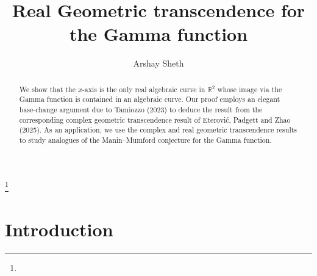 \documentclass[11pt,reqno]{amsart}
\theoremstyle{definition}
\numberwithin{equation}{section}
\begin{document}
\title{Real Geometric transcendence for the Gamma function}

\author{Arshay Sheth}
\address[Arshay Sheth]{School of Mathematics, Tata Institute of Fundamental Research, Homi Bhabha Road,
Mumbai - 400005, India.}
\urladdr{}

\thanks{}










\begin{abstract}
We show that the  $x$-axis is the only real algebraic curve in $\mathbb R^2$ whose image via the Gamma function is contained in an algebraic curve. Our proof employs an elegant base-change argument due to Tamiozzo (2023) to  deduce the result from the corresponding complex geometric transcendence result of Eterovi\'c, Padgett and Zhao (2025). As an application, we use the complex and real geometric transcendence results to study analogues of the Manin--Mumford conjecture for the Gamma function. 
\end{abstract}





\maketitle



\section{Introduction} \label{intro}
\end{document}
